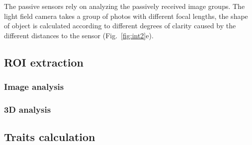 The passive sensors rely on analyzing the passively received image groups. The light field camera takes a group of photos with different focal lengths, the shape of object is calculated according to different degrees of clarity caused by the different distances to the sensor (Fig.~\ref{fig:int2}e). 


% 




\subsection{ROI extraction}

\subsubsection{Image analysis}



\subsubsection{3D analysis}





\subsection{Traits calculation}


